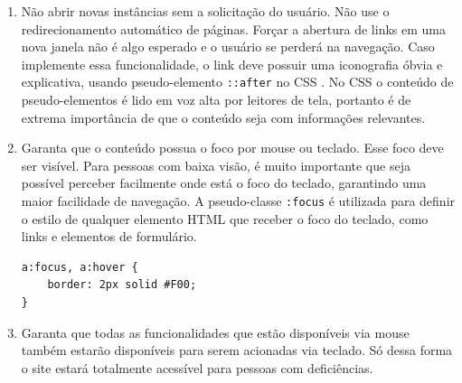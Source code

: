 {{{\begin{enumerate}
{\begin{lstlisting}[language=html,caption=separando links adjacentes]
<ul id="menu">
    <li> <a href="home.html">Home</a></li>
    <li> <a href="pesquisa.html">Pesquisa</a></li>
</ul>
\end{lstlisting}}
    \item Não abrir novas instâncias sem a solicitação do usuário. Não use o redirecionamento automático de páginas. Forçar a abertura de links em uma nova janela não é algo esperado e o usuário se perderá na navegação. Caso implemente essa funcionalidade, o link deve possuir uma iconografia óbvia e explicativa, usando pseudo-elemento \lstinline{::after} no CSS \cite{CSS}. No CSS o conteúdo de pseudo-elementos é lido em voz alta por leitores de tela, portanto é de extrema importância de que o conteúdo seja com informações relevantes.
    \item Garanta que o conteúdo possua o foco por mouse ou teclado. Esse foco deve ser visível. Para pessoas com baixa visão, é muito importante que seja possível perceber facilmente onde está o foco do teclado, garantindo uma maior facilidade de navegação. A pseudo-classe \lstinline{:focus} é utilizada para definir o estilo de qualquer elemento HTML \cite{HTML} que receber o foco do teclado, como links e elementos de formulário.
{\begin{lstlisting}[language=html,caption=usando o foco visível]
a:focus, a:hover {
    border: 2px solid #F00;
}
\end{lstlisting}}
    \item Garanta que todas as funcionalidades que estão disponíveis via mouse também estarão disponíveis para serem acionadas via teclado. Só dessa forma o site estará totalmente acessível para pessoas com deficiências. 
\end{enumerate}
}
}
}

\newpage
